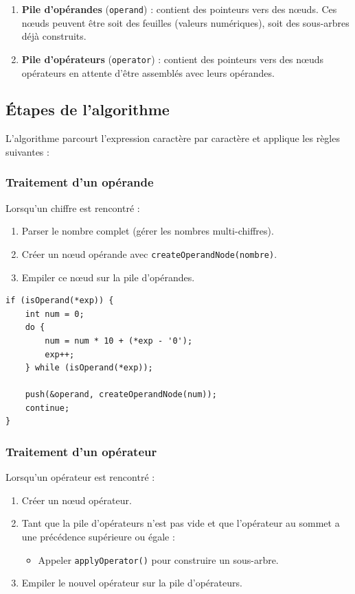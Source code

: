 \documentclass[12pt,a4paper]{article}
\begin{document}
\begin{enumerate}
    \item \textbf{Pile d'opérandes} (\texttt{operand}) : contient des pointeurs vers des nœuds. Ces nœuds peuvent être soit des feuilles (valeurs numériques), soit des sous-arbres déjà construits.
    \item \textbf{Pile d'opérateurs} (\texttt{operator}) : contient des pointeurs vers des nœuds opérateurs en attente d'être assemblés avec leurs opérandes.
\end{enumerate}

\subsection{Étapes de l'algorithme}

L'algorithme parcourt l'expression caractère par caractère et applique les règles suivantes :

\subsubsection{Traitement d'un opérande}

Lorsqu'un chiffre est rencontré :
\begin{enumerate}
    \item Parser le nombre complet (gérer les nombres multi-chiffres).
    \item Créer un nœud opérande avec \texttt{createOperandNode(nombre)}.
    \item Empiler ce nœud sur la pile d'opérandes.
\end{enumerate}

\begin{lstlisting}[caption={Traitement des opérandes dans la fonction evaluate}]
if (isOperand(*exp)) {
    int num = 0;
    do {
        num = num * 10 + (*exp - '0');
        exp++;
    } while (isOperand(*exp));

    push(&operand, createOperandNode(num));
    continue;
}
\end{lstlisting}

\subsubsection{Traitement d'un opérateur}

Lorsqu'un opérateur est rencontré :
\begin{enumerate}
    \item Créer un nœud opérateur.
    \item Tant que la pile d'opérateurs n'est pas vide et que l'opérateur au sommet a une précédence supérieure ou égale :
    \begin{itemize}
        \item Appeler \texttt{applyOperator()} pour construire un sous-arbre.
    \end{itemize}
    \item Empiler le nouvel opérateur sur la pile d'opérateurs.
\end{enumerate}
\end{document}
